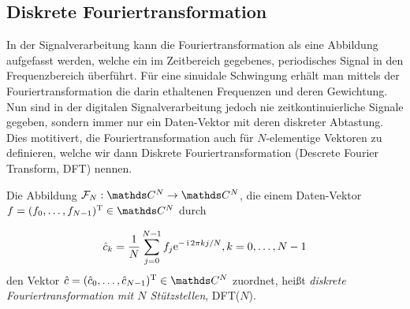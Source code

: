 
\subsection{Diskrete Fouriertransformation}

In der Signalverarbeitung kann die Fouriertransformation als eine Abbildung aufgefasst werden, welche ein im Zeitbereich gegebenes, periodisches Signal in den Frequenzbereich überführt. Für eine sinuidale Schwingung erhält man mittels der Fouriertransformation die darin ethaltenen Frequenzen und deren Gewichtung. \\
Nun sind in der digitalen Signalverarbeitung jedoch nie zeitkontinuierliche Signale gegeben, sondern immer nur ein Daten-Vektor mit deren diskreter Abtastung. Dies motitivert, die Fouriertransformation auch für $N$-elementige Vektoren zu definieren, welche wir dann Diskrete Fouriertransformation (Descrete Fourier Transform, DFT) nennen.

\begin{defn}

Die Abbildung $\calF_N: \C^N\to\C^N$, die einem Daten-Vektor $f=\transp{(f_0,\ldots,f_{N-1})} \in\C^N$ durch

\begin{displaymath}
\hat{c}_k = \frac{1}{N} \sum_{j=0}^{N-1} f_j {\operatorname{e}}^{-\operatorname{i} 2 \pi k j/N} , k=0,\ldots, N-1
\end{displaymath}
den Vektor $\hat{c} = \transp{(\hat{c}_0,\ldots,\hat{c}_{N-1})} \in\C^N$ zuordnet, heißt \emph{diskrete Fouriertransformation mit $N$ Stützstellen}, DFT($N$).
\end{defn}

